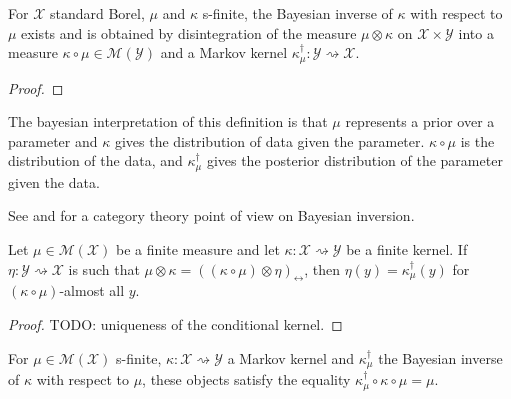 \begin{lemma}
  \label{lem:exists_bayesInv}
  For $\mathcal X$ standard Borel, $\mu$ and $\kappa$ s-finite, the Bayesian inverse of $\kappa$ with respect to $\mu$ exists and is obtained by disintegration of the measure $\mu \otimes \kappa$ on $\mathcal X \times \mathcal Y$ into a measure $\kappa \circ \mu \in \mathcal M(\mathcal Y)$ and a Markov kernel $\kappa_\mu^\dagger : \mathcal Y \rightsquigarrow \mathcal X$.
\end{lemma}

\begin{proof}%
{}

\end{proof}


The bayesian interpretation of this definition is that $\mu$ represents a prior over a parameter and $\kappa$ gives the distribution of data given the parameter. $\kappa \circ \mu$ is the distribution of the data, and $\kappa_\mu^\dagger$ gives the posterior distribution of the parameter given the data.

See \cite{clerc2017pointless} and \cite{dahlqvist2018borel} for a category theory point of view on Bayesian inversion.

\begin{lemma}
  \label{lem:eq_bayesInv_of_compProd_eq}
  \leanok
  Let $\mu \in \mathcal M(\mathcal X)$ be a finite measure and let $\kappa : \mathcal X \rightsquigarrow \mathcal Y$ be a finite kernel.
  If $\eta : \mathcal Y \rightsquigarrow \mathcal X$ is such that $\mu \otimes \kappa = ((\kappa \circ \mu) \otimes \eta)_\leftrightarrow$, then $\eta(y) = \kappa_\mu^\dagger(y)$ for $(\kappa \circ \mu)$-almost all $y$.
\end{lemma}

\begin{proof}\leanok
\uses{}
TODO: uniqueness of the conditional kernel.
\end{proof}

\begin{lemma}
  \label{lem:bayesInv_comp_self}
  \leanok
  For $\mu \in \mathcal M(\mathcal X)$ s-finite, $\kappa : \mathcal X \rightsquigarrow \mathcal Y$ a Markov kernel and $\kappa_\mu^\dagger$ the Bayesian inverse of $\kappa$ with respect to $\mu$, these objects satisfy the equality $\kappa_\mu^\dagger \circ \kappa \circ \mu = \mu$.
\end{lemma}

